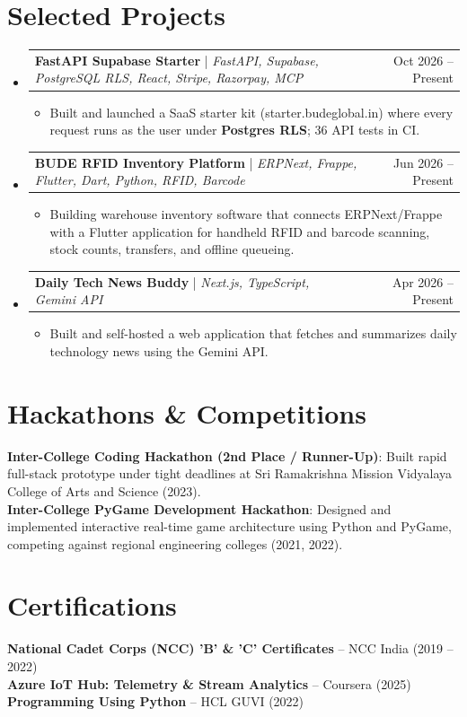\documentclass[letterpaper,10pt]{article}
\makeatletter
\newcommand{\resumeItem}[1]{
  \item\small{
    {#1 \vspace{-3pt}}
  }
}
\newcommand{\resumeProjectHeading}[2]{
    \item
    \begin{tabular*}{0.97\textwidth}{l@{\extracolsep{\fill}}r}
      \small#1 & #2 \\
    \end{tabular*}\vspace{-8pt}
}
\newcommand{\resumeSubHeadingListStart}{\begin{itemize}[leftmargin=0.15in, label={}, itemsep=0pt, topsep=1pt]}
\newcommand{\resumeSubHeadingListEnd}{\end{itemize}}
\newcommand{\resumeItemListStart}{\begin{itemize}[leftmargin=0.2in, itemsep=0pt, topsep=1pt]}
\newcommand{\resumeItemListEnd}{\end{itemize}\vspace{-6pt}}
\makeatother
\begin{document}
\section{Selected Projects}
    \resumeSubHeadingListStart
      \resumeProjectHeading
          {\textbf{FastAPI Supabase Starter} | \emph{FastAPI, Supabase, PostgreSQL RLS, React, Stripe, Razorpay, MCP}}{Oct 2026 -- Present}
          \resumeItemListStart
            \resumeItem{Built and launched a SaaS starter kit (starter.budeglobal.in) where every request runs as the user under \textbf{Postgres RLS}; 36 API tests in CI.}
          \resumeItemListEnd
      \resumeProjectHeading
          {\textbf{BUDE RFID Inventory Platform} | \emph{ERPNext, Frappe, Flutter, Dart, Python, RFID, Barcode}}{Jun 2026 -- Present}
          \resumeItemListStart
            \resumeItem{Building warehouse inventory software that connects ERPNext/Frappe with a Flutter application for handheld RFID and barcode scanning, stock counts, transfers, and offline queueing.}
          \resumeItemListEnd
      \resumeProjectHeading
          {\textbf{Daily Tech News Buddy} | \emph{Next.js, TypeScript, Gemini API}}{Apr 2026 -- Present}
          \resumeItemListStart
            \resumeItem{Built and self-hosted a web application that fetches and summarizes daily technology news using the Gemini API.}
          \resumeItemListEnd
    \resumeSubHeadingListEnd


\section{Hackathons \& Competitions}
 \begin{itemize}[leftmargin=0.15in, label={}, itemsep=0pt, topsep=1pt]
    \small{\item{
     \textbf{Inter-College Coding Hackathon (2nd Place / Runner-Up)}{: Built rapid full-stack prototype under tight deadlines at Sri Ramakrishna Mission Vidyalaya College of Arts and Science (2023).} \\
     \textbf{Inter-College PyGame Development Hackathon}{: Designed and implemented interactive real-time game architecture using Python and PyGame, competing against regional engineering colleges (2021, 2022).}
    }}
 \end{itemize}


\section{Certifications}
 \begin{itemize}[leftmargin=0.15in, label={}, itemsep=0pt, topsep=1pt]
    \small{\item{
     \textbf{National Cadet Corps (NCC) 'B' \& 'C' Certificates} -- NCC India (2019 -- 2022) \\
     \textbf{Azure IoT Hub: Telemetry \& Stream Analytics} -- Coursera (2025) \\
     \textbf{Programming Using Python} -- HCL GUVI (2022)
    }}
 \end{itemize}

\end{document}
